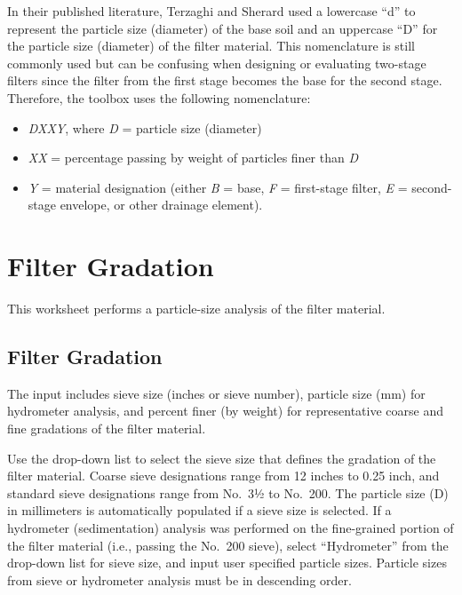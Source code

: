 \documentclass[
]{book}
\begin{document}
In their published literature, Terzaghi and Sherard used a lowercase ``d'' to represent the particle size (diameter) of the base soil and an uppercase ``D'' for the particle size (diameter) of the filter material. This nomenclature is still commonly used but can be confusing when designing or evaluating two-stage filters since the filter from the first stage becomes the base for the second stage. Therefore, the toolbox uses the following nomenclature:

\begin{itemize}
\item
  \emph{DXXY}, where \emph{D} = particle size (diameter)
\item
  \emph{XX} = percentage passing by weight of particles finer than \emph{D}
\item
  \emph{Y} = material designation (either \emph{B} = base, \emph{F} = first-stage filter, \emph{E} = second-stage envelope, or other drainage element).
\end{itemize}

\chapter{Filter Gradation}\label{filter-gradation}

This worksheet performs a particle-size analysis of the filter material.

\section{Filter Gradation}\label{filter-gradation-1}

The input includes sieve size (inches or sieve number), particle size (mm) for hydrometer analysis, and percent finer (by weight) for representative coarse and fine gradations of the filter material.

Use the drop-down list to select the sieve size that defines the gradation of the filter material. Coarse sieve designations range from 12 inches to 0.25 inch, and standard sieve designations range from No.~3½ to No.~200. The particle size (D) in millimeters is automatically populated if a sieve size is selected. If a hydrometer (sedimentation) analysis was performed on the fine-grained portion of the filter material (i.e., passing the No.~200 sieve), select ``Hydrometer'' from the drop-down list for sieve size, and input user specified particle sizes. Particle sizes from sieve or hydrometer analysis must be in descending order.
\end{document}
